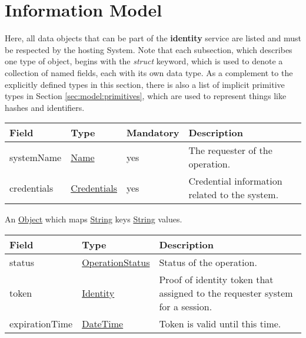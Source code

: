 \documentclass[a4paper]{arrowhead}
\newcommand{\pref}[1]{{\textcolor{ArrowheadGrey}{\hyperref[sec:model:primitives:#1]{#1}}}}
\begin{document}
\clearpage

\section{Information Model}
\label{sec:model}

Here, all data objects that can be part of the \textbf{identity} service are listed and must be respected by the hosting System.
Note that each subsection, which describes one type of object, begins with the \textit{struct} keyword, which is used to denote a collection of named fields, each with its own data type.
As a complement to the explicitly defined types in this section, there is also a list of implicit primitive types in Section \ref{sec:model:primitives}, which are used to represent things like hashes and identifiers.

{}
 
\begin{table}[ht!]
\begin{tabularx}{\textwidth}{| p{3cm} | p{3cm} | p{2cm} | X |} \hline
\rowcolor{gray!33} Field & Type & Mandatory & Description \\ \hline
systemName & \pref{Name} & yes & The requester of the operation. \\ \hline
credentials & \hyperref[sec:model:Credentials]{Credentials} & yes & Credential information related to the system. \\ \hline
\end{tabularx}
\end{table}


An \pref{Object} which maps \pref{String} keys  \pref{String} values.

 
\begin{table}[ht!]
\begin{tabularx}{\textwidth}{| p{4.25cm} | p{4cm} | X |} \hline
\rowcolor{gray!33} Field & Type      & Description \\ \hline
status & \pref{OperationStatus} & Status of the operation. \\ \hline
token & \hyperref[sec:model:Identity]{Identity} & Proof of identity token that assigned to the requester system for a session. \\ \hline
expirationTime & \pref{DateTime} & Token is valid until this time. \\ \hline
\end{tabularx}
\end{table}
\end{document}
